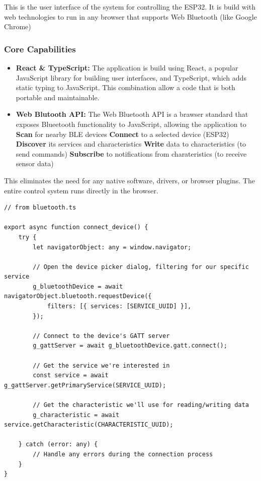 This is the user interface of the system for controlling the ESP32.
It is build with web technologies to run in any browser that supports
Web Bluetooth (like Google Chrome)

\subsubsection{Core Capabilities}

\begin{itemize}
    \item \textbf{React \& TypeScript:} The application is build using React, a popular 
        JavaScript library for building user interfaces, and TypeScript, which adds static
        typing to JavaScript. This combination allow a code that is both portable and 
        maintainable.
        \item \textbf{Web Blutooth API:} The Web Bluetooth API is a brawser standard that 
            exposes Blueetooth functionality to JavaScript, allowing the application to
            \subitem \textbf{Scan} for nearby BLE devices
            \subitem \textbf{Connect} to a selected device (ESP32)
            \subitem \textbf{Discover} its services and characteristics
            \subitem \textbf{Write} data to characteristics (to send commands)
            \subitem \textbf{Subscribe} to notifications from charateristics (to receive sensor data)
\end{itemize}

This eliminates the need for any native software, drivers, or browser plugins. The entire control
system runs directly in the browser.


\begin{lstlisting}[caption={Bluetooth connect\_device}]
// from bluetooth.ts

export async function connect_device() {
    try {
        let navigatorObject: any = window.navigator;

        // Open the device picker dialog, filtering for our specific service
        g_bluetoothDevice = await navigatorObject.bluetooth.requestDevice({
            filters: [{ services: [SERVICE_UUID] }],
        });

        // Connect to the device's GATT server
        g_gattServer = await g_bluetoothDevice.gatt.connect();

        // Get the service we're interested in
        const service = await g_gattServer.getPrimaryService(SERVICE_UUID);

        // Get the characteristic we'll use for reading/writing data
        g_characteristic = await service.getCharacteristic(CHARACTERISTIC_UUID);

    } catch (error: any) {
        // Handle any errors during the connection process
    }
}
\end{lstlisting}